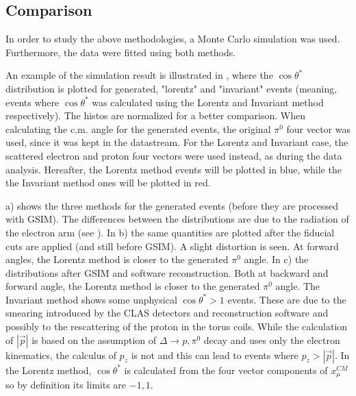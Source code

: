\subsection{Comparison}\label{sec:cmsystcomp} 
In order to study the above methodologies, a Monte Carlo simulation was used. Furthermore, the
data  were fitted  using both methods.

An example of the simulation result is illustrated in , where the $\cos\theta^*$ distribution 
is plotted for generated, "lorentz" and "invariant" events (meaning, events where $\cos\theta^*$ was
calculated using the Lorentz and Invariant method respectively). The histos are normalized for a better comparison.
When calculating the c.m. angle for the generated events, the original $\pi^0$ four vector was used, since it was kept in the datastream.
For the Lorentz and Invariant case, the scattered electron and proton four vectors were used instead, as during the data analysis.
Hereafter, {the \color{blue}Lorentz} method events will be plotted in blue, while the  {the \color{red}Invariant} method ones
will be plotted in red.

 a) shows the three methods for the generated events (before they are processed with GSIM).
The differences between the distributions are due to the radiation of the electron arm (see ). In 
 b) the same quantities are plotted after the fiducial cuts are applied (and still before GSIM).
A slight distortion is seen. At forward angles, the Lorentz method is closer to the generated $\pi^0$ angle.
In  c) the distributions after GSIM and software reconstruction. 
Both at backward and forward angle, the Lorentz method is closer to the generated $\pi^0$ angle.
The Invariant method shows some unphysical $\cos\theta^* > 1$ events. These are due 
to the smearing introduced by the CLAS detectors and reconstruction software and possibly 
to the rescattering of the proton in the torus coils. While the calculation of $|\vec{p}|$ is based on
the assumption of $\Delta \rightarrow p,\pi^0$ decay and uses only the electron kinematics, the calculus
of $p_z$ is not and this can lead to events where $p_z > |\vec{p}|$.
In the Lorentz method, $\cos\theta^*$ is calculated from the four vector components of $x_\mu^{CM}$ so by
definition its limits are $-1,1$. 



